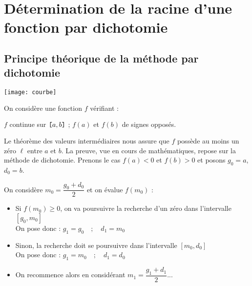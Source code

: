\section{Détermination de la racine d'une fonction par dichotomie}

\subsection{Principe théorique de la méthode par dichotomie}
%
\begin{marginfigure}
\texttt{[image: courbe]}
\end{marginfigure}
% 
On considère une fonction $f$ vérifiant : 
\begin{center} $f$ continue sur $\verb![!a,b\verb!]!$ ;  $f(a)$ et $f(b)$ de signes opposés.
\end{center} Le théorème des valeurs intermédiaires nous assure que $f$ possède au moins un zéro $\ell$ entre $a$ et $b$. La preuve, vue en cours de mathématiques, repose sur la méthode de dichotomie. Prenons le cas $f(a)<0$ et $f(b)>0$ et posons $g_0=a$, $d_0=b$. 


 On considère $m_0 = \dfrac{g_0+d_0}{2}$ et on évalue $f(m_0)$ : 
\begin{itemize}
 \item Si $f(m_0)\geq 0$, on va poursuivre la recherche d'un zéro dans l'intervalle  {$[g_0,m_0]$} \\On pose donc  : 
 $g_1 =  {g_0} \quad ;\quad  d_1 =  {m_0}$\vspace*{2mm}
  \item Sinon,  la recherche doit se poursuivre  dans l'intervalle  {$[m_0,d_0]$} \\ On pose donc  : 
 $g_1 =  {m_0} \quad ; \quad d_1 =  {d_0}$\vspace*{2mm}
 \item On recommence alors en considérant $m_1 = \dfrac{g_1+d_1}{2}$...\\
 \end{itemize}

%
%
%
% 
%
%



